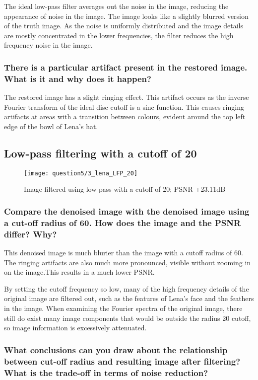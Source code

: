 The ideal low-pass filter averages out the noise in the image, reducing the appearance of noise in the image. The image looks like a slightly blurred version of the truth image. As the noise is uniformly distributed and the image details are mostly concentrated in the lower frequencies, the filter reduces the high frequency noise in the image.

\subsubsection{There is a particular artifact present in the restored image. What is it and why does it happen?}

The restored image has a slight ringing effect. This artifact occurs as the inverse Fourier transform of the ideal disc cutoff is a sinc function. This causes ringing artifacts at areas with a transition between colours, evident around the top left edge of the bowl of Lena's hat.

\subsection{Low-pass filtering with a cutoff of 20}
\begin{figure}[ht]
\centering
	\texttt{[image: question5/3\_lena\_LFP\_20]}
	\caption{Image filtered using low-pass with a cutoff of 20; PSNR +23.11dB}
\end{figure}

\subsubsection{Compare the denoised image with the denoised image using a cut-off radius of 60. How does the
image and the PSNR differ? Why?}

This denoised image is much blurier than the image with a cutoff radius of 60. The ringing artifacts are also much more pronounced, visible without zooming in on the image.This results in a much lower PSNR. 

By setting the cutoff frequency so low, many of the high frequency details of the original image are filtered out, such as the features of Lena's face and the feathers in the image. When examining the Fourier spectra of the original image, there still do exist many image components that would be outside the radius 20 cutoff, so image information is excessively attenuated.

\subsubsection{What conclusions can you draw about the relationship between cut-off radius and resulting image after filtering? What is the trade-off in terms of noise reduction?}

